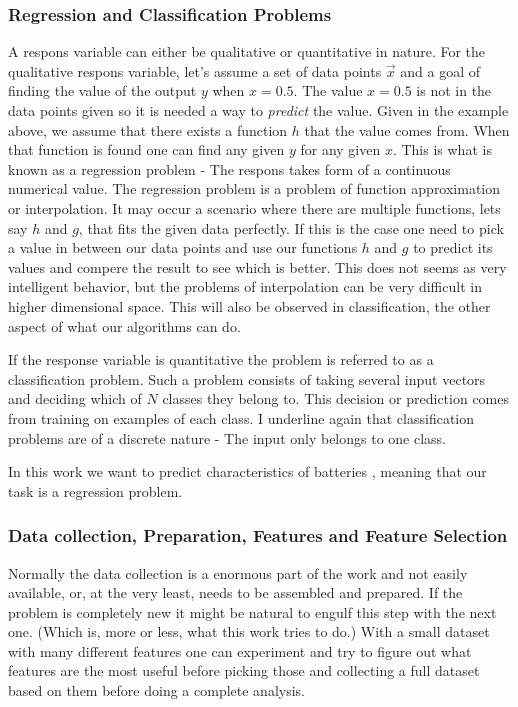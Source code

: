 	\subsubsection{Regression and Classification Problems}
		A respons variable can either be qualitative or quantitative in nature. For the qualitative respons variable, let's assume a set of data points $ \vec{x}$ and a goal of finding the value of the output $y$ when $x = 0.5$. The value $x = 0.5$ is not in the data points given so it is needed a way to \textit{predict} the value. Given in the example above, we assume that there exists a function $h$ that the value comes from. When that function is found one can find any given $y$ for any given $x$. This is what is known as a regression problem - The respons takes form of a continuous numerical value. The regression problem is a problem of function approximation or interpolation. It may occur a scenario where there are multiple functions, lets say $h$ and $g$, that fits the given data perfectly. If this is the case one need to pick a value in between our data points and use our functions $h$ and $g$ to predict its values and compere the result to see which is better. 
	This does not seems as very intelligent behavior, but the problems of interpolation can be very difficult in higher dimensional space. This will also be observed in classification, the other aspect of what our algorithms can do.  
	
	If the response variable is quantitative the problem is referred to as a classification problem. Such a problem consists of taking several input vectors and deciding which of $N$ classes they belong to. This decision or prediction comes from training on examples of each class. I underline again that classification problems are of a discrete nature - The input only belongs to one class.
	
	In this work we want to predict characteristics of batteries , meaning  that our task is a regression problem.
	
	\subsubsection{Data collection, Preparation, Features and Feature Selection}
	 
	Normally the data collection is a enormous part of the work and not easily available, or, at the very least, needs to be assembled and prepared. If the problem is completely new it might be natural to engulf this step with the next one. (Which is, more or less, what this work tries to do.) With a small dataset with many different features one can experiment and try to figure out what features are the most useful before picking those and collecting a full dataset based on them before doing a complete analysis. 
	
